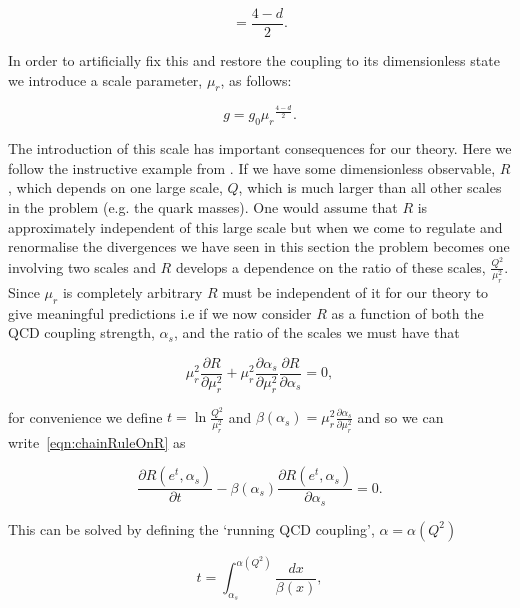 		\begin{equation}
			[g] = \frac{4-d}{2}.
		\end{equation}

		In order to artificially fix this and restore the coupling to its dimensionless state we
		introduce a scale parameter, $\mu_r$, as follows:

		\begin{equation}
			g = g_0{\mu_r}^{\frac{4-d}{2}}.
		\end{equation}

		The introduction of this scale has important consequences for our theory.  Here we follow the instructive example
		from \cite{pinkBook}.  If we have some dimensionless observable, $R$, which depends on one large scale, $Q$, which
		is much larger than all other scales in the problem (e.g. the quark masses).  One would assume that $R$ is
		approximately independent of this large scale but when we come to regulate and renormalise the divergences we have
		seen in this section the problem becomes one involving two scales and $R$ develops a dependence on the ratio of
		these scales, $\frac{Q^2}{\mu_r^2}$.  Since $\mu_r$ is completely arbitrary $R$ must be independent of it for our
		theory to give meaningful predictions i.e if we now consider $R$ as a function of both the QCD coupling strength,
		$\alpha_s$, and the ratio of the scales we must have that

		\begin{equation}
			\mu_r^2\frac{\partial R}{\partial\mu_r^2} + \mu_r^2\frac{\partial \alpha_s}{\partial \mu_r^2}\frac{\partial R}{\partial\alpha_s} = 0,
			\label{eqn:chainRuleOnR}
		\end{equation}

		for convenience we define $t = \ln\frac{Q^2}{\mu_r^2}$ and $\beta(\alpha_s) = \mu_r^2\frac{\partial \alpha_s}{\partial \mu_r^2}$
		and so we can write~\eqref{eqn:chainRuleOnR} as

		\begin{equation}
			\frac{\partial R(e^t, \alpha_s)}{\partial t} - \beta(\alpha_s)\frac{\partial R(e^t, \alpha_s)}{\partial \alpha_s} = 0.
		\end{equation}

		This can be solved by defining the `running QCD coupling', $\alpha=\alpha(Q^2)$

		\begin{equation}
			t = \int_{\alpha_s}^{\alpha(Q^2)}\frac{dx}{\beta(x)},
			\label{eqn:solvingRunning}
		\end{equation}


